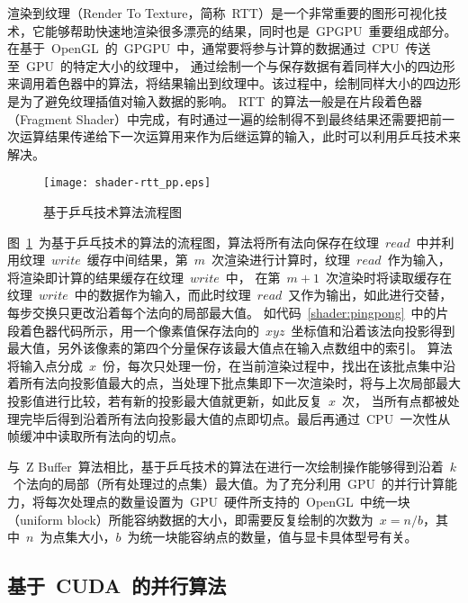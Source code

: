 渲染到纹理（Render To Texture，简称~RTT）是一个非常重要的图形可视化技术，它能够帮助快速地渲染很多漂亮的结果，同时也是~GPGPU~重要组成部分。在基于~OpenGL~的~GPGPU~中，通常要将参与计算的数据通过~CPU~传送至~GPU~的特定大小的纹理中，
通过绘制一个与保存数据有着同样大小的四边形来调用着色器中的算法\cite{gpgpuqiu}，将结果输出到纹理中。该过程中，绘制同样大小的四边形是为了避免纹理插值对输入数据的影响。
RTT~的算法一般是在片段着色器（Fragment Shader）中完成，有时通过一遍的绘制得不到最终结果还需要把前一次运算结果传递给下一次运算用来作为后继运算的输入，此时可以利用乒乓技术来解决。

\begin{figure}[htbp]
  \centering
  \texttt{[image: shader-rtt\_pp.eps]}
  \caption{基于乒乓技术算法流程图}
  \label{fig:shader-rtt-pingpong-flowchart}
\end{figure}

图~\ref{fig:shader-rtt-pingpong-flowchart}~为基于乒乓技术的算法的流程图，算法将所有法向保存在纹理~$read$~中并利用纹理~$write$~缓存中间结果，第~$m$~次渲染进行计算时，纹理~$read$~作为输入，将渲染即计算的结果缓存在纹理~$write$~中，
在第~$m+1$~次渲染时将读取缓存在纹理~$write$~中的数据作为输入，而此时纹理~$read$~又作为输出，如此进行交替，每步交换只更改沿着每个法向的局部最大值。
如代码~\ref{shader:pingpong}~中的片段着色器代码所示，用一个像素值保存法向的~$xyz$~坐标值和沿着该法向投影得到最大值，另外该像素的第四个分量保存该最大值点在输入点数组中的索引。
算法将输入点分成~$x$~份，每次只处理一份，在当前渲染过程中，找出在该批点集中沿着所有法向投影值最大的点，当处理下批点集即下一次渲染时，将与上次局部最大投影值进行比较，若有新的投影最大值就更新，如此反复~$x$~次，
当所有点都被处理完毕后得到沿着所有法向投影最大值的点即切点。最后再通过~CPU~一次性从帧缓冲中读取所有法向的切点。


与~Z Buffer~算法相比，基于乒乓技术的算法在进行一次绘制操作能够得到沿着~$k$~个法向的局部（所有处理过的点集）最大值。为了充分利用~GPU~的并行计算能力，将每次处理点的数量设置为~GPU~硬件所支持的~OpenGL~中统一块（uniform
block）所能容纳数据的大小，即需要反复绘制的次数为~$x=n/b$，其中~$n$~为点集大小，$b$~为统一块能容纳点的数量，值与显卡具体型号有关。 

\subsection{基于~CUDA~的并行算法}
\label{subsec:determ-normals-by-cuda}

